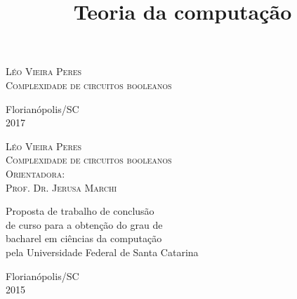 \title{Teoria da computação}
\author{}
\date{}



\begin{titlepage}

\begin{center}

\textsc{\Large Léo Vieira Peres} \\[5.0cm]
\textsc{\LARGE Complexidade de circuitos booleanos}

\vfill

Florianópolis/SC \\ 2017

\end{center}

\end{titlepage}

\begin{center}

\textsc{\Large Léo Vieira Peres} \\[5.0cm]
\textsc{\LARGE Complexidade de circuitos booleanos} \\[3.0cm]
\textsc{\large Orientadora: \\ Prof. Dr. Jerusa Marchi } \\[4.0cm]

\begin{flushright}

\large Proposta de trabalho de conclusão \\ de curso para a obtenção do grau de \\ bacharel em ciências da computação \\ pela Universidade Federal de Santa Catarina

\end{flushright}
\vfill

Florianópolis/SC \\ 2015


\end{center}

\pagebreak

\tableofcontents

\pagebreak

